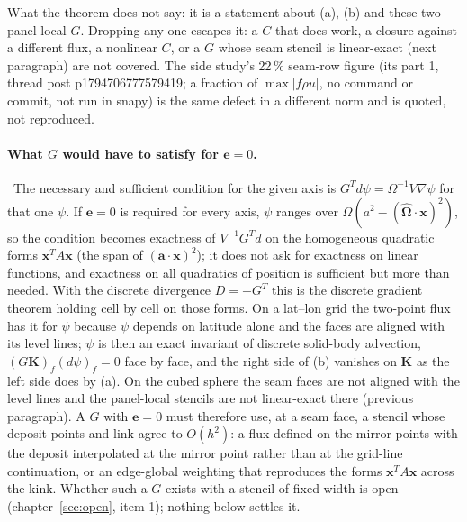 What the theorem does not say: it is a statement about (a), (b) and these two panel-local $G$. Dropping any one
escapes it: a $C$ that does work, a closure against a different flux, a nonlinear $C$, or a $G$ whose seam stencil
is linear-exact (next paragraph) are not covered. The side study's 22\,\% seam-row figure (its part 1,
thread post p1794706777579419; a fraction of $\max|f\rho u|$, no command or commit, not run in snapy) is the same
defect in a different norm and is quoted, not reproduced.

\paragraph{What $G$ would have to satisfy for $\bm e=0$.} \derived\ The necessary and sufficient condition for the
given axis is $G^T d\psi=\Omega^{-1}V\nabla\psi$ for that one $\psi$. If $\bm e=0$ is required for every axis, $\psi$
ranges over $\Omega(a^2-(\hat{\bm\Omega}\cdot\bm x)^2)$, so the condition becomes exactness of $V^{-1}G^T d$ on the
homogeneous quadratic forms $\bm x^T A\bm x$ (the span of $(\bm a\cdot\bm x)^2$); it does not ask for exactness on
linear functions, and exactness on all quadratics of position is sufficient but more than needed. With the
discrete divergence $D=-G^T$ this is the discrete gradient theorem holding cell by cell on those forms. On a
lat--lon grid the two-point flux has it for $\psi$ because $\psi$ depends on latitude alone and the faces are
aligned with its level lines; $\psi$ is then an exact invariant of discrete solid-body advection,
$(G\bm K)_f(d\psi)_f=0$ face by face, and the right side of (b) vanishes on $\bm K$ as the left side does by (a).
On the cubed sphere the seam faces are not aligned with the level lines and the panel-local stencils are not
linear-exact there (previous paragraph). A $G$ with $\bm e=0$ must therefore use, at a seam face, a stencil whose
deposit points and link agree to $O(h^2)$: a flux defined on the mirror points with the deposit interpolated at the
mirror point rather than at the grid-line continuation, or an edge-global weighting that reproduces the forms
$\bm x^TA\bm x$ across the kink. Whether such a $G$ exists with a stencil of fixed width is open
(chapter~\ref{sec:open}, item 1); nothing below settles it.

